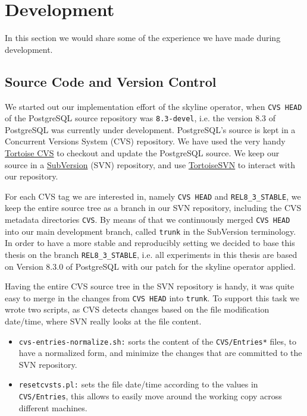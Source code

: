 \section{Development}
In this section we would share some of the experience we have made 
during development.

\subsection{Source Code and Version Control}
We started out our implementation effort of the skyline operator, when
\texttt{CVS HEAD} of the PostgreSQL source repository was
\texttt{8.3-devel}, i.e. the version 8.3 of PostgreSQL was currently
under development.  PostgreSQL's source is kept in a Concurrent Versions
System (CVS) repository.  We have used the very handy
\href{http://www.tortoisecvs.org/}{Tortoise CVS} to checkout and
update the PostgreSQL source.  We keep our source in a
\href{http://subversion.tigris.org/}{SubVersion} (SVN) repository, and use
\href{http://tortoisesvn.tigris.org/}{TortoiseSVN} to interact with our
repository.

For each CVS tag we are interested in, namely \texttt{CVS HEAD} and
\texttt{REL8\_3\_STABLE}, we keep the entire source tree as a branch 
in our SVN repository, including the CVS metadata directories
\texttt{CVS}.  By means of that we continuously merged \texttt{CVS HEAD}
into our main development branch, called \texttt{trunk} in the
SubVersion terminology.  In order to have a more stable and
reproducibly setting we decided to base this thesis on the branch
\texttt{REL8\_3\_STABLE}, i.e. all experiments in this thesis are based
on Version 8.3.0 of PostgreSQL with our patch for the skyline
operator applied.

Having the entire CVS source tree in the SVN repository is handy, it
was quite easy to merge in the changes from \texttt{CVS HEAD} into
\texttt{trunk}.  To support this task we wrote two scripts, as CVS
detects changes based on the file modification date/time, where SVN
really looks at the file content.

\begin{itemize}
\item \texttt{cvs-entries-normalize.sh:}
sorts the content of the \texttt{CVS/Entries*} files, to have a
normalized form, and minimize the changes that are committed to the
SVN repository.

\item \texttt{resetcvsts.pl:}
sets the file date/time according to the values in \texttt{CVS/Entries},
this allows to easily move around the working copy across different machines.
\end{itemize}

